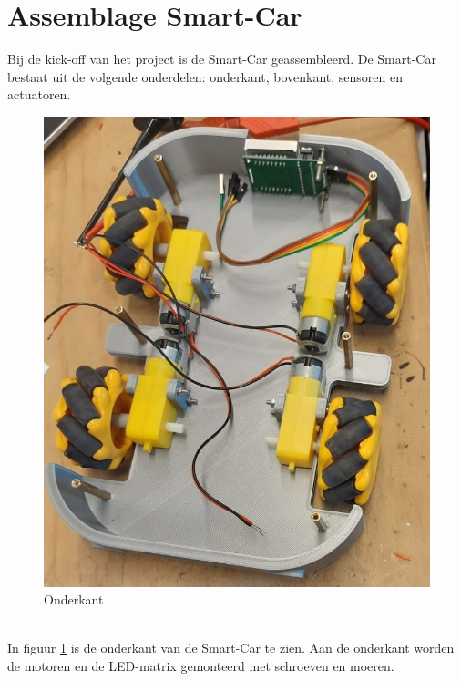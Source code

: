 

\section{Assemblage Smart-Car}
Bij de kick-off van het project is de \gls{Smart-Car} geassembleerd.
De \gls{Smart-Car} bestaat uit de volgende onderdelen: onderkant, bovenkant, sensoren en actuatoren.
\\
\begin{figure}[h]
    \centering
    \includegraphics[scale = 0.35]{Media/Figuren/assembleren onderkant.jpg}
    \caption{Onderkant}
    \label{Onderkant-Smart-Car}
\end{figure}
\\
In figuur \ref{Onderkant-Smart-Car} is de onderkant van de \gls{Smart-Car} te zien. Aan de onderkant worden de motoren en de LED-matrix gemonteerd met schroeven en moeren.
\\
